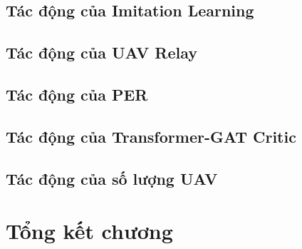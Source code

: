 \subsection{Tác động của Imitation Learning}
\label{subsec:sim:ablation:il}

\subsection{Tác động của UAV Relay}
\label{subsec:sim:ablation:uav}

\subsection{Tác động của PER}
\label{subsec:sim:ablation:per}

\subsection{Tác động của Transformer-GAT Critic}
\label{subsec:sim:ablation:tgat}

\subsection{Tác động của số lượng UAV}
\label{subsec:sim:ablation:kuav}

\section{Tổng kết chương}
\label{sec:sim:summary}
